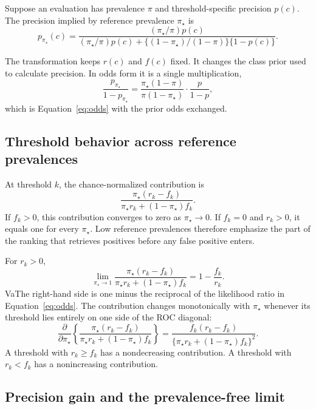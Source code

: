\documentclass[11pt]{article}
\theoremstyle{remark}
\begin{document}
Suppose an evaluation has prevalence $\pi$ and threshold-specific precision $p(c)$. The precision implied by reference prevalence $\pi_\star$ is
\begin{equation}
p_{\pi_\star}(c)
=
\frac{(\pi_\star/\pi)p(c)}
{(\pi_\star/\pi)p(c)
+
\{(1-\pi_\star)/(1-\pi)\}\{1-p(c)\}}.
\label{eq:precision-transform}
\end{equation}

The transformation keeps $r(c)$ and $f(c)$ fixed. It changes the class prior used to calculate precision. In odds form it is a single multiplication,
\[
\frac{p_{\pi_\star}}{1-p_{\pi_\star}}
=
\frac{\pi_\star(1-\pi)}{\pi(1-\pi_\star)}
\cdot
\frac{p}{1-p},
\]
which is Equation~\eqref{eq:odds} with the prior odds exchanged.

\subsection{Threshold behavior across reference prevalences}
\label{app:reference-behavior}

At threshold $k$, the chance-normalized contribution is
\[
\frac{\pi_\star(r_k-f_k)}
{\pi_\star r_k+(1-\pi_\star)f_k}.
\]
If $f_k>0$, this contribution converges to zero as $\pi_\star\to0$. If $f_k=0$ and $r_k>0$, it equals one for every $\pi_\star$. Low reference prevalences therefore emphasize the part of the ranking that retrieves positives before any false positive enters.

For $r_k>0$,
\begin{equation}
\lim_{\pi_\star\to1}
\frac{\pi_\star(r_k-f_k)}
{\pi_\star r_k+(1-\pi_\star)f_k}
=
1-\frac{f_k}{r_k}.
\label{eq:precg-limit}
\end{equation}
VaThe right-hand side is one minus the reciprocal of the likelihood ratio in Equation~\eqref{eq:odds}. The contribution changes monotonically with $\pi_\star$ whenever its threshold lies entirely on one side of the ROC diagonal:
\begin{equation}
\frac{\partial}{\partial\pi_\star}
\left\{
\frac{\pi_\star(r_k-f_k)}
{\pi_\star r_k+(1-\pi_\star)f_k}
\right\}
=
\frac{f_k(r_k-f_k)}
{\{\pi_\star r_k+(1-\pi_\star)f_k\}^2}.
\label{eq:reference-prevalence-derivative}
\end{equation}
A threshold with $r_k\geq f_k$ has a nondecreasing contribution. A threshold with $r_k<f_k$ has a nonincreasing contribution.

\subsection{Precision gain and the prevalence-free limit}
\label{app:precg}
\end{document}
